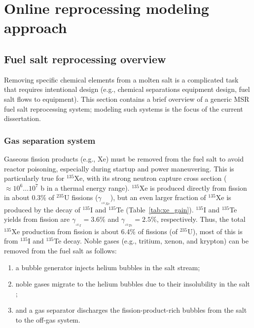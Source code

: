 \chapter{Online reprocessing modeling approach}
\section{Fuel salt reprocessing overview} \label{sec:reproc-plant}
Removing specific chemical elements from a molten salt is a complicated 
task that requires intentional design (e.g., chemical separations equipment 
design, fuel salt flows to equipment). This section contains a brief overview 
of a generic \gls{MSR} fuel salt reprocessing system; modeling such systems is 
the focus of the current dissertation.

\subsection{Gas separation system} \label{sec:gas-separ}
Gaseous fission products (e.g., Xe) must be removed from the fuel salt 
to avoid reactor poisoning, especially during startup and power maneuvering. 
This is particularly true for $^{135}$Xe, with its strong neutron capture 
cross section ($\approx10^6\dots10^7$ b in a thermal energy range). $^{135}$Xe 
is produced directly from fission in about 0.3\% of $^{235}$U fissions 
($\gamma_{_{^{135}Xe}}$), but an even larger fraction of $^{135}$Xe is 
produced by the decay of $^{135}$I and $^{135}$Te (Table~\ref{tab:xe_gain}). 
$^{135}$I and $^{135}$Te yields from fission are 
$\gamma_{_{^{135}I}}\!=3.6$\% and $\gamma_{_{^{135}Te}}\!=2.5$\%, 
respectively. Thus, the total $^{135}$Xe production from fission is about 
6.4\% of fissions (of $^{235}$U), most of this is from $^{135}$I and 
$^{135}$Te decay. Noble gases (e.g., tritium, xenon, and krypton) can be 
removed from the fuel salt as follows:
\begin{enumerate}[label=(\alph*)]
	\item a bubble generator injects helium bubbles in the salt stream;
	\item noble gases migrate to the helium bubbles due to their insolubility 
	in the salt \cite{robertson_conceptual_1971};
	\item and a gas separator discharges the fission-product-rich bubbles from 
	the salt to the off-gas system.
\end{enumerate}
